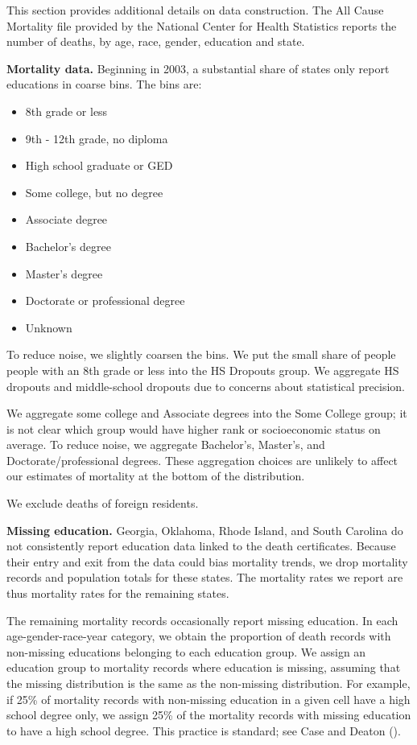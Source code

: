 This section provides additional details on data construction.  The
All Cause Mortality file provided by the National Center for Health
Statistics reports the number of deaths, by age, race, gender,
education and state.

\textbf{Mortality data.} Beginning in 2003, a substantial share of states only report
educations in coarse bins. The bins are: 
\begin{itemize}
\item 8th grade or less
\item 9th - 12th grade, no diploma
\item High school graduate or GED 
\item Some college, but no degree
\item Associate degree
\item Bachelor's degree
\item Master's degree
\item Doctorate or professional degree
\item Unknown 
\end{itemize}

To reduce noise, we slightly coarsen the bins. We put the small share of people
people with an 8th grade or less into the HS Dropouts group. We aggregate HS dropouts and
middle-school dropouts due to concerns about statistical precision.

We aggregate some college and Associate degrees into the Some College
group; it is not clear which group would have
higher rank or socioeconomic status on average. To reduce noise, we aggregate
Bachelor's, Master's, and Doctorate/professional degrees. These
aggregation choices are unlikely to affect our estimates of mortality
at the bottom of the distribution. 

We exclude deaths of foreign residents. 

\textbf{Missing education.} Georgia, Oklahoma, Rhode
Island, and South Carolina do not consistently report education data
linked to the death certificates. Because
their entry and exit from the data could bias mortality trends, we
drop mortality records and population totals for these states. The
mortality rates we report are thus mortality rates for the remaining states. 

The remaining mortality records occasionally report missing
education. In each age-gender-race-year category, we obtain the
proportion of death records with non-missing educations belonging to
each education group. We assign an education group to mortality
records where education is missing, assuming that the missing
distribution is the same as the non-missing distribution. For example,
if 25\% of mortality records with non-missing education in a
given cell have a high school degree only, we assign 25\% of the
mortality records with missing education to have a high school
degree. This practice is standard; see Case and Deaton
(\citeyear{Case2015,Case2017}).

